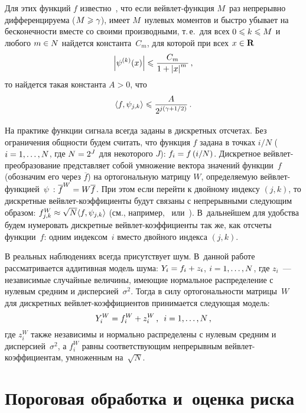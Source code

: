 \begin{multicols}{2}
Для этих функций $f$ известно~\cite{10sh}, что если вейв\-лет-функция $M$~раз 
непрерывно дифференцируема ($M\hm\geqslant\gamma$), имеет $M$~нулевых моментов 
и быст\-ро убывает на бесконечности вместе со своими производными, т.\,е.\ 
для всех $0\hm\leqslant k \hm\leqslant M$ и любого $m\hm\in N$ найдется 
константа~$C_m$, для которой при всех $x\hm\in\mathbf{R}$
$$
\left\vert\psi^{(k)}(x)\right\vert\leqslant\displaystyle\frac{\displaystyle C_m\mathstrut}{\displaystyle 1+\left\vert x\right\vert^m\mathstrut}\,,
$$
то найдется такая константа $A>0$, что
\begin{equation}
\langle f,\psi_{j,k}\rangle\leqslant\displaystyle\frac{\displaystyle A\mathstrut}{\displaystyle 2^{j\left(\gamma+{1}/{2}\right)}\mathstrut}\,.\label{e2sh}
\end{equation}

На практике функции сигнала всегда заданы в дискретных отсчетах. Без ограничения общ\-ности 
будем считать, что функция $f$ задана в точках ${i}/{N}$ ($i\hm=1,\ldots , N$, где $N\hm=2^J$ 
для некоторого $J$): $f_i\hm=f\left({i}/{N}\right)$.
Дискретное вейвлет-преобразование представляет собой умножение вектора значений функции~$f$ 
(обозначим его через $\overline{f}$) на ортогональную матрицу $W$, определяемую 
вейвлет-функцией~$\psi$~\cite{10sh}: $\overline{f}^{W}\hm=W\overline{f}$. 
При этом если перейти к двойному индексу $(j,k)$, то дискретные вейвлет-коэффициенты 
будут связаны с непрерывными следующим образом: 
$f^{W}_{j,k}\hm\approx \sqrt{N}\langle f,\psi_{j,k}\rangle$ (см., например,~\cite{1sh} 
или~\cite{11sh}). 
В~дальнейшем для удобства будем нумеровать дискретные вейв\-лет-ко\-эф\-фи\-ци\-ен\-ты 
так же, как отсчеты 
функции~$f$: одним индексом~$i$ вместо двойного индекса $(j,k)$.

В реальных наблюдениях всегда присутствует шум. В~данной работе рассматривается 
аддитивная модель шума:
$Y_i=f_i\hm+z_i$, $i\hm=1,\ldots,N$,
где $z_i$~--- независимые случайные величины, име\-ющие нормальное распределение 
с нулевым средним и дисперсией~$\sigma^2$. Тогда в силу ортогональности мат\-ри\-цы~$W$ 
для дискретных вейвлет-коэффициентов принимается следующая модель:
$$
Y^W_i=f^{W}_{i}+z^W_i\,,\enskip i=1,\ldots,N\,,
$$
где $z^W_i$ также независимы и нормально распределены с нулевым средним и дисперсией~$\sigma^2$, 
а $f^{W}_{i}$ равны соответствующим непрерывным вейв\-лет-ко\-эф\-фи\-ци\-ен\-там, умноженным на~$\sqrt{N}$.

\section{Пороговая обработка и~оценка риска}


\end{multicols}

